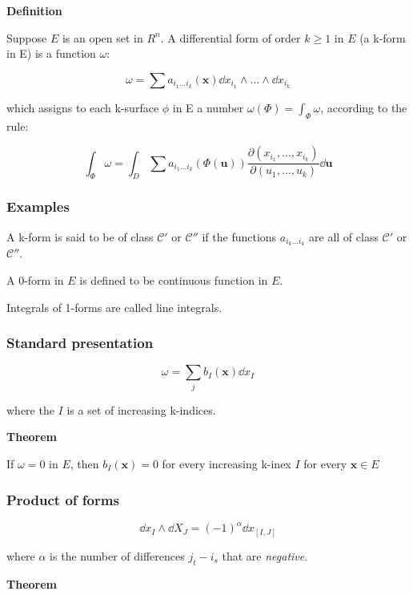 \documentclass[11pt]{article}
\begin{document}
\textbf{Definition}

Suppose \(E\) is an open set in \(R^n\). A differential form of order \(k \geq 1\) in \(E\) (a k-form in E) is a function \(\omega\):

\[
\omega = \sum a_{i_1 \ldots i_k}(\bm{x}) \dd{x_{i_1}} \wedge \ldots \wedge \dd{x_{i_k}}
\]

which assigns to each k-surface \(\phi\) in E a number \(\omega(\Phi) = \int_\Phi \omega\), according to the rule:

\[
\int_\Phi \omega = \int_D \sum a_{i_1 \ldots i_k}(\Phi(\bm{u})) \frac{\partial(x_i_1,\ldots,x_i_k)}{\partial(u_1,\ldots,u_k)}  \dd{\bm{u}}
\]

\subsubsection{Examples}
\label{sec:org72c1ae8}

A k-form is said to be of class \(\mathcal{C}'\) or \(\mathcal{C}''\) if the functions \(a_{i_k\ldots i_k}\) are all of class \(\mathcal{C}'\) or \(\mathcal{C}''\).

A 0-form in \(E\) is defined to be continuous function in \(E\).

Integrals of 1-forms are called line integrals.



\subsubsection{Standard presentation}
\label{sec:org961f873}


\[
\omega = \sum_j b_{I}(\bm{x}) \dd{x_I}
\]

where the \(I\) is a set of increasing k-indices.

\textbf{Theorem}

If \(\omega = 0\) in \(E\), then \(b_{I}(\bm{x}) = 0\) for every increasing k-inex \(I\) for every \(\bm{x} \in E\)


\subsubsection{Product of forms}
\label{sec:org7bd6558}

\[
\dd{x_I} \wedge \dd{X_J} = (-1)^\alpha \dd{x_{[I,J]}}
\]

where \(\alpha\) is the number of differences \(j_t - i_s\) that are \emph{negative}.

\textbf{Theorem}
\end{document}
